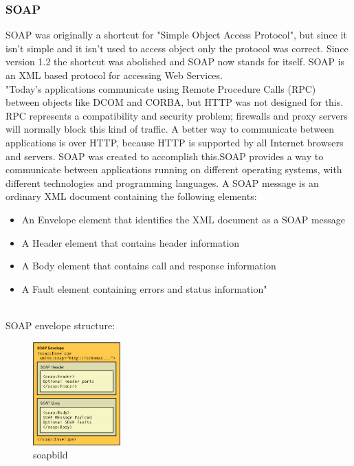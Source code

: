 \documentclass[12pt]{article}
\begin{document}
\subsubsection{SOAP}
SOAP was originally a shortcut for "Simple Object Access Protocol", but since it isn't simple 
and it isn't used to access object only the protocol was correct. Since version 1.2 the shortcut
was abolished and SOAP now stands for itself. SOAP is an XML based protocol for accessing Web Services. \\
"Today's applications communicate using Remote Procedure Calls (RPC) between objects like DCOM and CORBA, but HTTP was not designed for this. RPC represents a compatibility and security problem; firewalls and proxy servers will normally block this kind of traffic. A better way to communicate between applications is over HTTP, because HTTP is supported by all Internet browsers and servers. SOAP was created to accomplish this.SOAP provides a way to communicate between applications running on different operating systems, with different technologies and programming languages. A SOAP message is an ordinary XML document containing the following elements:
\begin{itemize}
\item An Envelope element that identifies the XML document as a SOAP message
\item A Header element that contains header information
\item A Body element that contains call and response information
\item A Fault element containing errors and status information"
\end{itemize}
\cite{soap}\\
SOAP envelope structure:\\

\begin{figure}
	\centering
	\includegraphics[width=0.3\textwidth]{images/soa_envelope}
	\caption{soapbild}
    \label{fig:Soapenvelope}
	\end{figure}
	\FloatBarrier
\end{document}
